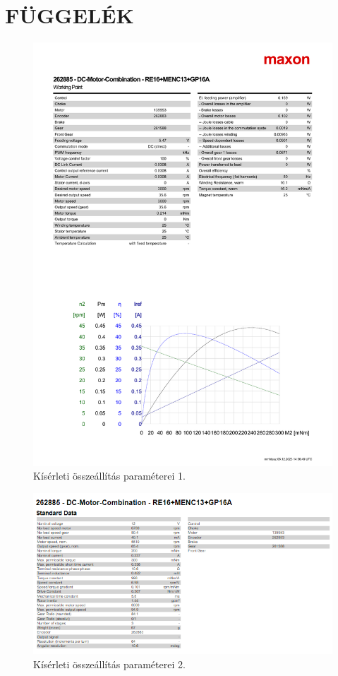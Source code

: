 \part*{FÜGGELÉK}

\begin{figure}[H]
    \begin{center}
    \includegraphics[width=\textwidth]{images/motor_params1.pdf}
    \caption{Kísérleti összeállítás paraméterei 1.}\label{fig:motor_params1}
    \end{center}
\end{figure}

\begin{figure}[H]
    \begin{center}
    \includegraphics[width=\textwidth]{images/motor_params2.png}
    \caption{Kísérleti összeállítás paraméterei 2.}\label{fig:motor_params2}
    \end{center}
\end{figure}

\cleardoublepage
